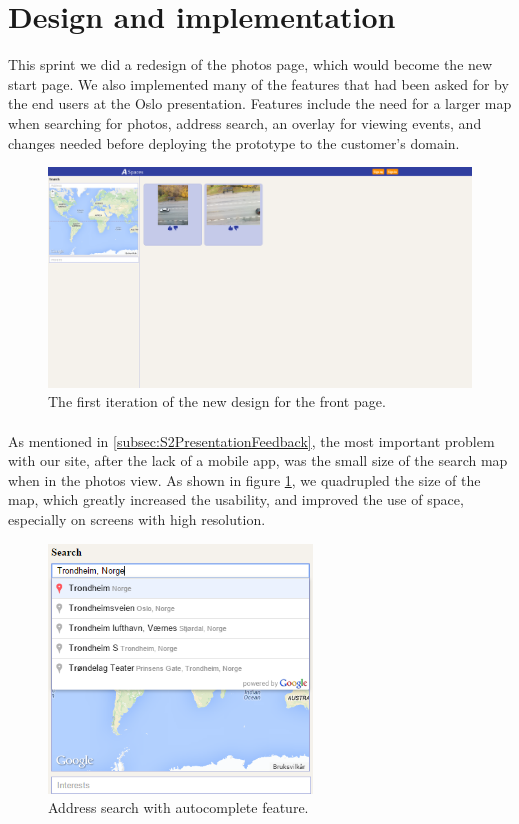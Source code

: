\section{Design and implementation}
\label{sec:S5DesignImpl}

This sprint we did a redesign of the photos page, which would become the new start page. We also implemented many of the features that had been asked for by the end users at the Oslo presentation. Features include the need for a larger map when searching for photos, address search, an overlay for viewing events, and changes needed before deploying the prototype to the customer's domain.

\begin{figure}[ht!]
  \centering
  \includegraphics[width=\linewidth]{./img/webpage/27Oct/Frontpage27Oct}
  \caption{The first iteration of the new design for the front page.}
  \label{fig:S5DesignImplFront27Oct}
\end{figure}

\paragraph{} As mentioned in \ref{subsec:S2PresentationFeedback}, the most important problem with our site, after the lack of a mobile app, was the small size of the search map when in the photos view. As shown in figure \ref{fig:S5DesignImplFront27Oct}, we quadrupled the size of the map, which greatly increased the usability, and improved the use of space, especially on screens with high resolution.

\begin{figure}[ht!]
  \centering
  \includegraphics[width=70mm]{./img/webpage/27Oct/AddressAutocomplete.png}
  \caption{Address search with autocomplete feature.}
  \label{fig:S5DesignImplAddressAuto}
\end{figure}

